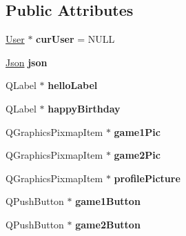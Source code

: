 \subsection*{Public Attributes}
\begin{DoxyCompactItemize}
\item 
\hypertarget{classWelcomeWindow_adf9d45bef2656e20de1f0fda3da6de95}{\hyperlink{classUser}{User} $\ast$ {\bfseries cur\-User} = N\-U\-L\-L}\label{classWelcomeWindow_adf9d45bef2656e20de1f0fda3da6de95}

\item 
\hypertarget{classWelcomeWindow_ab8507dc4fbc7ece52dcbd9607840b308}{\hyperlink{classJson}{Json} {\bfseries json}}\label{classWelcomeWindow_ab8507dc4fbc7ece52dcbd9607840b308}

\item 
\hypertarget{classWelcomeWindow_a3a8a6bdf275bf15135afdcda58e404b9}{Q\-Label $\ast$ {\bfseries hello\-Label}}\label{classWelcomeWindow_a3a8a6bdf275bf15135afdcda58e404b9}

\item 
\hypertarget{classWelcomeWindow_a5c7f6fed6aa596e7136b2d2e920225fa}{Q\-Label $\ast$ {\bfseries happy\-Birthday}}\label{classWelcomeWindow_a5c7f6fed6aa596e7136b2d2e920225fa}

\item 
\hypertarget{classWelcomeWindow_a763e1ed9bde558a472e47e330d5d98a1}{Q\-Graphics\-Pixmap\-Item $\ast$ {\bfseries game1\-Pic}}\label{classWelcomeWindow_a763e1ed9bde558a472e47e330d5d98a1}

\item 
\hypertarget{classWelcomeWindow_affd78ea126d680bf6a1aed66b0c73bcd}{Q\-Graphics\-Pixmap\-Item $\ast$ {\bfseries game2\-Pic}}\label{classWelcomeWindow_affd78ea126d680bf6a1aed66b0c73bcd}

\item 
\hypertarget{classWelcomeWindow_a77b486a7541f2731c874dff15b0500ef}{Q\-Graphics\-Pixmap\-Item $\ast$ {\bfseries profile\-Picture}}\label{classWelcomeWindow_a77b486a7541f2731c874dff15b0500ef}

\item 
\hypertarget{classWelcomeWindow_ac74aeed412d90ec3800659a413c5b691}{Q\-Push\-Button $\ast$ {\bfseries game1\-Button}}\label{classWelcomeWindow_ac74aeed412d90ec3800659a413c5b691}

\item 
\hypertarget{classWelcomeWindow_a67cc4d6dee956184e049eacbaa6fd3ca}{Q\-Push\-Button $\ast$ {\bfseries game2\-Button}}\label{classWelcomeWindow_a67cc4d6dee956184e049eacbaa6fd3ca}


\end{DoxyCompactItemize}
